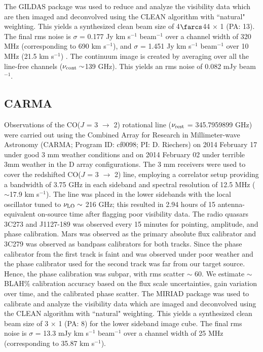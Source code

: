 \documentclass[]{emulateapj}
\begin{document}
The GILDAS package was used to reduce and analyze the visibility data which are
then imaged and deconvolved using
the CLEAN algorithm with ``natural" weighting. This yields a synthesized clean
beam size of 4$\farcs$44 $\times$ 1 (PA: 13\degr). The final rms noise
is $\sigma$ =
0.177 
Jy km s$^{-1}$ beam$^{-1}$ over a channel width of 320 MHz (corresponding to
690 km s$^{-1}$), and $\sigma$ = 1.451 Jy km s$^{-1}$ beam$^{-1}$ over 10 MHz 
(21.5 km s$^{-1}$) . 
The continuum image is created by %
averaging over all the line-free channels ($\nu_{\rm cont}\sim$139 GHz). This
yields an rms noise of 0.082 mJy beam$^{-1}$. %

\subsection{CARMA} \label{sec:carmadata}
%
Observations of the CO($J$ = 3 $\rightarrow$ 2) rotational line ($\nu_{\rm
rest}$ = 345.7959899 GHz) 
 were carried out using the Combined Array for Research in Millimeter-wave
Astronomy (CARMA; Program ID: cf0098; PI: D. Riechers) on 2014 February 17 
under good 3 mm weather
conditions and on 2014 February 02 under terrible 3mm weather in the D array
configurations.  The 3 mm receivers were used to cover
the 
redshifted CO($J$ = 3 $\rightarrow$ 2) line, employing a correlator setup
providing a bandwidth of 3.75 GHz in each sideband and spectral resolution of
12.5 MHz ($
\sim$17.9 km s$^{-1}$). The line was placed in the
lower sidebands with the local oscillator tuned to $\nu_{\rm LO}\sim$ 216 GHz;
this resulted in 2.94 hours of 15 antenna-equivalent on-source time after
flagging poor visibility data. 
The radio quasars 3C273 and J1127-189 was observed every 15 minutes for
pointing, amplitude, and phase calibration. Mars was observed as the
primary
absolute flux calibrator and 3C279 was observed as bandpass calibrators for
both tracks. 
Since the phase calibrator from the first track is faint and was observed under
poor weather and the phase calibrator used for the second track was
far from our target source.
Hence, the phase calibration was 
subpar, with rms scatter $\sim$ 60\degr. 
We estimate $\sim
$BLAH\% calibration accuracy based on the flux scale uncertainties, gain variation over time, and 
the calibrated phase scatter.
The MIRIAD package was used to calibrate and analyze the visibility data which
are imaged and deconvolved using
the CLEAN algorithm with ``natural" weighting. This yields a synthesized clean
beam size of 3 $\times$ 1 (PA: 8\degr) for the lower sideband
image cube. The
final 
rms noise is $\sigma$ = 13.3 mJy km s$^{-1}$ beam$^{-1}$ over a channel width
of
25 MHz (corresponding to 35.87 km s$^{-1}$). 
\end{document}
